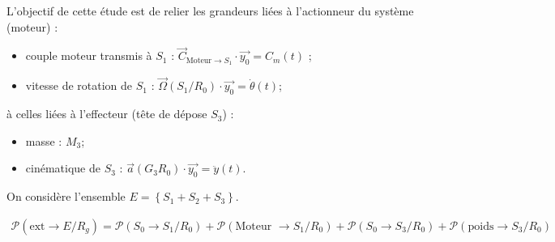 \begin{obj}
L'objectif de cette étude est de relier les grandeurs liées à l'actionneur du système (moteur) :
\begin{itemize}
\item couple moteur transmis à $S_1$ : $\overrightarrow{C}_{\text{Moteur}\to S_1}\cdot \overrightarrow{y_0}=C_m(t)$ ;
\item vitesse de rotation de $S_1$ : $\overrightarrow{\Omega}(S_1/R_0)\cdot \overrightarrow{y_0}=\dot{\theta}(t)$;
\end{itemize} 
à celles liées à l'effecteur (tête de dépose $S_3$) : 
\begin{itemize}
\item masse : $M_3$;
\item cinématique de $S_3$ : $\overrightarrow{a}(G_3R_0)\cdot \overrightarrow{y_0}=\ddot{y}(t)$.
\end{itemize}
\end{obj}


On considère l'ensemble $E=\left\{S_1+S_2+S_3\right\}$.



\ifprof\begin{corrige}
\begin{center}
\end{center}
\end{corrige}\else\fi



\ifprof\begin{corrige}
\begin{align*}
\mathcal{P}(\text{ext}\rightarrow E/R_g)=\mathcal{P}(S_0 \rightarrow S_1/R_0)+\mathcal{P}(\text{Moteur }\rightarrow S_1/R_0)
+\mathcal{P}(S_0 \rightarrow S_3/R_0)+\mathcal{P}(\text{poids} \rightarrow S_3/R_0)
\end{align*}
\end{corrige}\else\fi




